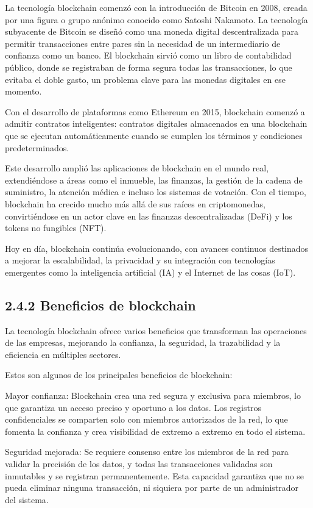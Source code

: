 \documentclass[12pt,a4paper]{article}
\begin{document}
La tecnología blockchain comenzó con la introducción de Bitcoin en 2008, creada por una figura o grupo anónimo conocido como Satoshi Nakamoto. La tecnología subyacente de Bitcoin se diseñó como una moneda digital descentralizada para permitir transacciones entre pares sin la necesidad de un intermediario de confianza como un banco. El blockchain sirvió como un libro de contabilidad público, donde se registraban de forma segura todas las transacciones, lo que evitaba el doble gasto, un problema clave para las monedas digitales en ese momento.

Con el desarrollo de plataformas como Ethereum en 2015, blockchain comenzó a admitir contratos inteligentes: contratos digitales almacenados en una blockchain que se ejecutan automáticamente cuando se cumplen los términos y condiciones predeterminados.

Este desarrollo amplió las aplicaciones de blockchain en el mundo real, extendiéndose a áreas como el inmueble, las finanzas, la gestión de la cadena de suministro, la atención médica e incluso los sistemas de votación. Con el tiempo, blockchain ha crecido mucho más allá de sus raíces en criptomonedas, convirtiéndose en un actor clave en las finanzas descentralizadas (DeFi) y los tokens no fungibles (NFT).

Hoy en día, blockchain continúa evolucionando, con avances continuos destinados a mejorar la escalabilidad, la privacidad y su integración con tecnologías emergentes como la inteligencia artificial (IA) y el Internet de las cosas (IoT).

\subsection*{2.4.2 Beneficios de blockchain}

La tecnología blockchain ofrece varios beneficios que transforman las operaciones de las empresas, mejorando la confianza, la seguridad, la trazabilidad y la eficiencia en múltiples sectores.

Estos son algunos de los principales beneficios de blockchain:

Mayor confianza: Blockchain crea una red segura y exclusiva para miembros, lo que garantiza un acceso preciso y oportuno a los datos. Los registros confidenciales se comparten solo con miembros autorizados de la red, lo que fomenta la confianza y crea visibilidad de extremo a extremo en todo el sistema.

Seguridad mejorada: Se requiere consenso entre los miembros de la red para validar la precisión de los datos, y todas las transacciones validadas son inmutables y se registran permanentemente. Esta capacidad garantiza que no se pueda eliminar ninguna transacción, ni siquiera por parte de un administrador del sistema.
\end{document}
